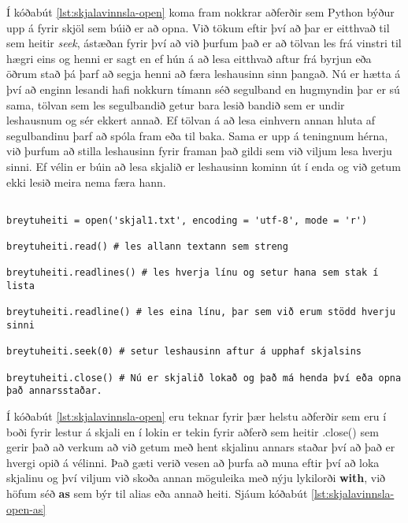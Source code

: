 Í kóðabút \ref{lst:skjalavinnsla-open} koma fram nokkrar aðferðir sem Python býður upp á fyrir skjöl sem búið er að opna.
Við tökum eftir því að þar er eitthvað til sem heitir \textit{seek}, ástæðan fyrir því að við þurfum það er að tölvan les frá vinstri til hægri eins og henni er sagt en ef hún á að lesa eitthvað aftur frá byrjun eða öðrum stað þá þarf að segja henni að færa leshausinn sinn þangað.
Nú er hætta á því að enginn lesandi hafi nokkurn tímann séð segulband en hugmyndin þar er sú sama, tölvan sem les segulbandið getur bara lesið bandið sem er undir leshausnum og sér ekkert annað.
Ef tölvan á að lesa einhvern annan hluta af segulbandinu þarf að spóla fram eða til baka.
Sama er upp á teningnum hérna, við þurfum að stilla leshausinn fyrir framan það gildi sem við viljum lesa hverju sinni.
Ef vélin er búin að lesa skjalið er leshausinn kominn út í enda og við getum ekki lesið meira nema færa hann.

\begin{lstlisting}[caption=Hér sjáum við hvernig má opna skjal sem við eigum til á sama stað og þessi kóði er geymdur, label=lst:skjalavinnsla-open]
	
breytuheiti = open('skjal1.txt', encoding = 'utf-8', mode = 'r')	
	
breytuheiti.read() # les allann textann sem streng

breytuheiti.readlines() # les hverja línu og setur hana sem stak í lista

breytuheiti.readline() # les eina línu, þar sem við erum stödd hverju sinni

breytuheiti.seek(0) # setur leshausinn aftur á upphaf skjalsins

breytuheiti.close() # Nú er skjalið lokað og það má henda því eða opna það annarsstaðar.
\end{lstlisting}

Í kóðabút \ref{lst:skjalavinnsla-open} eru teknar fyrir þær helstu aðferðir sem eru í boði fyrir lestur á skjali en í lokin er tekin fyrir aðferð sem heitir .close() sem gerir það að verkum að við getum með hent skjalinu annars staðar því að það er hvergi opið á vélinni. 
Það gæti verið vesen að þurfa að muna eftir því að loka skjalinu og því viljum við skoða annan möguleika með nýju lykilorði \textbf{with}, við höfum séð \textbf{as} sem býr til alias eða annað heiti.
Sjáum kóðabút \ref{lst:skjalavinnsla-open-as} 
 
